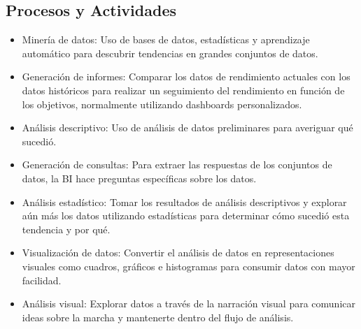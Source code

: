 \documentclass[twoside,twocolumn]{article}
\begin{document}
\subsection{Procesos y Actividades}
\begin{itemize}
	\item Minería de datos:
	\newline
	 Uso de bases de datos, estadísticas y aprendizaje automático para descubrir tendencias en grandes conjuntos de datos.
	\newline

		\item Generación de informes:
	\newline
	Comparar los datos de rendimiento actuales con los datos históricos para realizar un seguimiento del rendimiento en función de los objetivos, normalmente utilizando dashboards personalizados.
	\newline

		\item Análisis descriptivo:
	\newline
	Uso de análisis de datos preliminares para averiguar qué sucedió.
	\newline

		\item Generación de consultas:
	\newline
	Para extraer las respuestas de los conjuntos de datos, la BI hace preguntas específicas sobre los datos.
	\newline

		\item Análisis estadístico:
	\newline
	Tomar los resultados de análisis descriptivos y explorar aún más los datos utilizando estadísticas para determinar cómo sucedió esta tendencia y por qué.
	\newline

		\item Visualización de datos:
	\newline
	Convertir el análisis de datos en representaciones visuales como cuadros, gráficos e histogramas para consumir datos con mayor facilidad.
	\newline

		\item Análisis visual:
	\newline
	Explorar datos a través de la narración visual para comunicar ideas sobre la marcha y mantenerte dentro del flujo de análisis.
\newline


\end{itemize}
\end{document}
